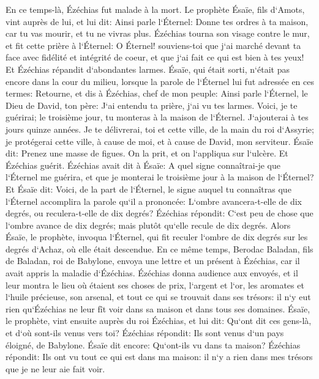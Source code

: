\verse En ce temps-là, Ézéchias fut malade à la mort. Le prophète Ésaïe, fils d`Amots, vint auprès de lui, et lui dit: Ainsi parle l`Éternel: Donne tes ordres à ta maison, car tu vas mourir, et tu ne vivras plus. 
\verse Ézéchias tourna son visage contre le mur, et fit cette prière à l`Éternel: 
\verse O Éternel! souviens-toi que j`ai marché devant ta face avec fidélité et intégrité de coeur, et que j`ai fait ce qui est bien à tes yeux! Et Ézéchias répandit d`abondantes larmes. 
\verse Ésaïe, qui était sorti, n`était pas encore dans la cour du milieu, lorsque la parole de l`Éternel lui fut adressée en ces termes: 
\verse Retourne, et dis à Ézéchias, chef de mon peuple: Ainsi parle l`Éternel, le Dieu de David, ton père: J`ai entendu ta prière, j`ai vu tes larmes. Voici, je te guérirai; le troisième jour, tu monteras à la maison de l`Éternel. 
\verse J`ajouterai à tes jours quinze années. Je te délivrerai, toi et cette ville, de la main du roi d`Assyrie; je protégerai cette ville, à cause de moi, et à cause de David, mon serviteur. 
\verse Ésaïe dit: Prenez une masse de figues. On la prit, et on l`appliqua sur l`ulcère. Et Ézéchias guérit. 
\verse Ézéchias avait dit à Ésaïe: A quel signe connaîtrai-je que l`Éternel me guérira, et que je monterai le troisième jour à la maison de l`Éternel? 
\verse Et Ésaïe dit: Voici, de la part de l`Éternel, le signe auquel tu connaîtras que l`Éternel accomplira la parole qu`il a prononcée: L`ombre avancera-t-elle de dix degrés, ou reculera-t-elle de dix degrés? 
\verse Ézéchias répondit: C`est peu de chose que l`ombre avance de dix degrés; mais plutôt qu`elle recule de dix degrés. 
\verse Alors Ésaïe, le prophète, invoqua l`Éternel, qui fit reculer l`ombre de dix degrés sur les degrés d`Achaz, où elle était descendue. 
\verse En ce même temps, Berodac Baladan, fils de Baladan, roi de Babylone, envoya une lettre et un présent à Ézéchias, car il avait appris la maladie d`Ézéchias. 
\verse Ézéchias donna audience aux envoyés, et il leur montra le lieu où étaient ses choses de prix, l`argent et l`or, les aromates et l`huile précieuse, son arsenal, et tout ce qui se trouvait dans ses trésors: il n`y eut rien qu`Ézéchias ne leur fît voir dans sa maison et dans tous ses domaines. 
\verse Ésaïe, le prophète, vint ensuite auprès du roi Ézéchias, et lui dit: Qu`ont dit ces gens-là, et d`où sont-ils venus vers toi? Ézéchias répondit: Ils sont venus d`un pays éloigné, de Babylone. 
\verse Ésaïe dit encore: Qu`ont-ils vu dans ta maison? Ézéchias répondit: Ils ont vu tout ce qui est dans ma maison: il n`y a rien dans mes trésors que je ne leur aie fait voir. 

